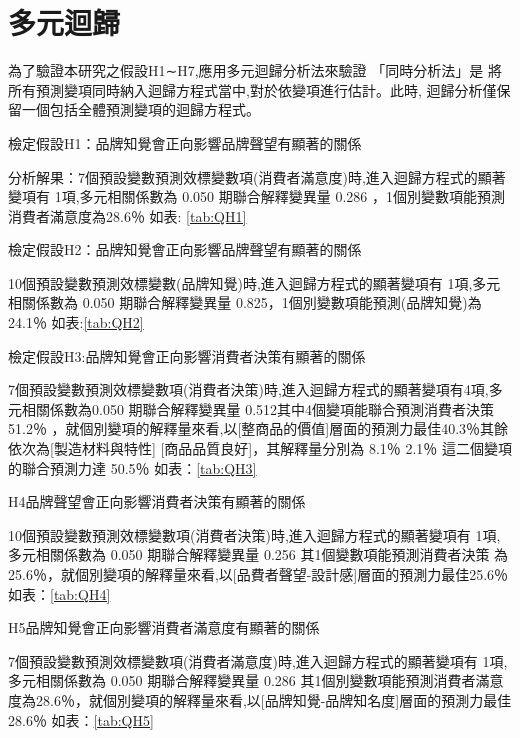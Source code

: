 \section{多元迴歸}
為了驗證本研究之假設H1∼H7,應用多元迴歸分析法來驗證 「同時分析法」是 將所有預測變項同時納入迴歸方程式當中,對於依變項進行估計。此時, 迴歸分析僅保留一個包括全體預測變項的迴歸方程式。

\begin{enumerate}

檢定假設H1：品牌知覺會正向影響品牌聲望有顯著的關係

分析解果：7個預設變數預測效標變數項(消費者滿意度)時,進入迴歸方程式的顯著變項有 1項,多元相關係數為 0.050 期聯合解釋變異量 0.286 ，1個別變數項能預測消費者滿意度為28.6％ 如表: \ref{tab:QH1}

檢定假設H2：品牌知覺會正向影響品牌聲望有顯著的關係

10個預設變數預測效標變數(品牌知覺)時,進入迴歸方程式的顯著變項有 1項,多元相關係數為 0.050 期聯合解釋變異量 0.825，1個別變數項能預測(品牌知覺)為24.1％ 如表:\ref{tab:QH2}


檢定假設H3:品牌知覺會正向影響消費者決策有顯著的關係

7個預設變數預測效標變數項(消費者決策)時,進入迴歸方程式的顯著變項有4項,多元相關係數為0.050 期聯合解釋變異量 0.512其中4個變項能聯合預測消費者決策51.2％ ，就個別變項的解釋量來看,以[整商品的價值]層面的預測力最佳40.3％其餘依次為[製造材料與特性] [商品品質良好]，其解釋量分別為 8.1％ 2.1％  這二個變項的聯合預測力達 50.5％ 如表：\ref{tab:QH3}


H4品牌聲望會正向影響消費者決策有顯著的關係

10個預設變數預測效標變數項(消費者決策)時,進入迴歸方程式的顯著變項有 1項,多元相關係數為 0.050 期聯合解釋變異量 0.256 其1個變數項能預測消費者決策 為25.6％，就個別變項的解釋量來看,以[品費者聲望-設計感]層面的預測力最佳25.6％ 如表：\ref{tab:QH4}


H5品牌知覺會正向影響消費者滿意度有顯著的關係

7個預設變數預測效標變數項(消費者滿意度)時,進入迴歸方程式的顯著變項有 1項,多元相關係數為 0.050 期聯合解釋變異量 0.286 其1個別變數項能預測消費者滿意度為28.6％，就個別變項的解釋量來看,以[品牌知覺-品牌知名度]層面的預測力最佳28.6％ 如表：\ref{tab:QH5}


\end{enumerate}
